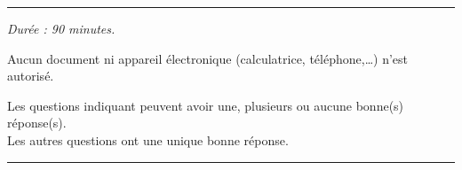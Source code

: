 \begin{center}
  \hrule \vspace{0.5em}
  \em
  Durée : 90 minutes.

  Aucun document ni appareil électronique (calculatrice,
  téléphone,\dots) n'est autorisé.

  Les questions indiquant \multiSymbole{} peuvent avoir une, plusieurs
  ou aucune bonne(s) réponse(s). \\ Les autres questions ont une unique
  bonne réponse.

  \vspace{0.5em}
  \hrule \vspace{0.5em}
\end{center}
\vspace{1ex}
